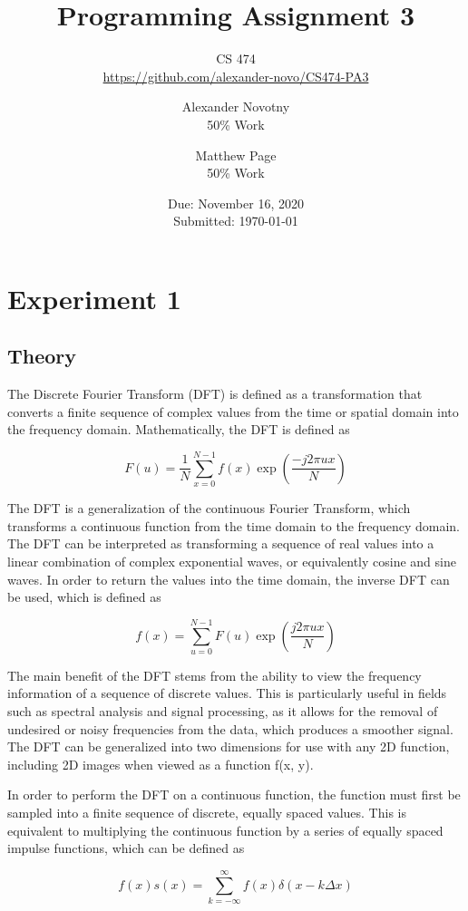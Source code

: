 \documentclass[headings=optiontoheadandtoc,listof=totoc,parskip=full]{scrartcl}
\title{Programming Assignment 3}
\subtitle{CS 474\\\url{https://github.com/alexander-novo/CS474-PA3}}
\author{Alexander Novotny\\50\% Work \and Matthew Page\\50\% Work}
\date{Due: November 16, 2020 \\ Submitted: \today}
\begin{document}
\maketitle
\tableofcontents
{}

\newpage
{}

\section{Experiment 1}
\label{sec:exp-1}

\subsection{Theory}

The Discrete Fourier Transform (DFT) is defined as a transformation that converts a finite sequence of complex values from the time or spatial domain into the frequency domain. Mathematically, the DFT is defined as 

    \[
    	F(u) = \frac{1}{N}\sum_{x=0}^{N-1} f(x) \exp(\frac{-j2\pi ux}{N})
    \]

The DFT is a generalization of the continuous Fourier Transform, which transforms a continuous function from the time domain to the frequency domain. The DFT can be interpreted as transforming a sequence of real values into a linear combination of complex exponential waves, or equivalently cosine and sine waves. In order to return the values into the time domain, the inverse DFT can be used, which is defined as

    \[
    	f(x) = \sum_{u=0}^{N-1} F(u) \exp(\frac{j2\pi ux}{N})
    \]

The main benefit of the DFT stems from the ability to view the frequency information of a sequence of discrete values. This is particularly useful in fields such as spectral analysis and signal processing, as it allows for the removal of undesired or noisy frequencies from the data, which produces a smoother signal. The DFT can be generalized into two dimensions for use with any 2D function, including 2D images when viewed as a function f(x, y).

In order to perform the DFT on a continuous function, the function must first be sampled into a finite sequence of discrete, equally spaced values. This is equivalent to multiplying the continuous function by a series of equally spaced impulse functions, which can be defined as 

    \[
    	f(x)s(x) = \sum_{k=-\infty}^{\infty} f(x) \delta(x-k\Delta x)
    \]
\end{document}
